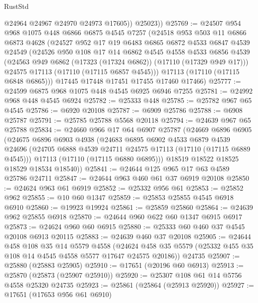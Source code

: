 \begin{lexlean}{RustStd}
\begin{coremodule}
            @24964
            @24967
            @24970
            @24973
            @17605))
        @25023))
@25769 := @24507
    @954
    @968
    @1075
    @448
    @6866
    @6875
    @4545
    @7257
    (@24518
      @953
      @503
      @11
      @6866
      @6873
      @4628
      (@24527
        @952
        @17
        @19
        @6483
        @6865
        @6872
        @4533
        @6847
        @4539
        @24549
        (@24526
          @950
          @108
          @17
          @14
          @6862
          @4545
          @4558
          @4533
          @6856
          @4539
          (@24563 @949 @6862 (@17323 (@17324 @6862)) (@17110 (@17329 @949 @17)))
          @24575
          @17113
          (@17110 (@17115 @6857 @4545)))
        @17113
        (@17110 (@17115 @6848 @6865)))
      @17445
      @17448
      @17451
      @17455
      @17460
      @17466)
@25777 := @24599 @6875 @968 @1075 @448 @4545 @6925 @6946 @7255
@25781 := @24992 @968 @448 @4545 @6924
@25782 := @25333 @448
@25785 := @25782 @967 @65 @4545
@25786 := @6920 @20108
@25787 := @6909 @25786
@25788 := @6908 @25787
@25791 := @25785 @25788 @5568 @20118
@25794 := @24639 @967 @65 @25788
@25834 := @24660
    @966
    @17
    @64
    @6907
    @25787
    (@24669
      @6896
      @6905
      (@24675
        @6896
        @6903
        @4938
        (@24683
          @6895
          @6902
          @4533
          @6879
          @4539
          @24696
          (@24705 @6888 @4539 @24711 @24575 @17113 (@17110 (@17115 @6889 @4545)))
          @17113
          (@17110 (@17115 @6880 @6895)))
        @18519
        @18522
        @18525
        @18529
        @18534
        @18540))
@25841 := @24644 @125 @965 @17 @63 @4589 @25786 @24711
@25847 := @24644 @963 @460 @61 @37 @6919 @20108
@25850 := @24624 @963 @61 @6919
@25852 := @25332 @956 @61
@25853 := @25852 @962
@25855 := @10 @60 @1347
@25859 := @25853 @25855 @4545 @6918 @6910
@25860 := @19923 @19924
@25861 := @25859 @25860
@25864 := @24639 @962 @25855 @6918
@25870 := @24644 @960 @622 @60 @1347 @6915 @6917
@25873 := @24624 @960 @60 @6915
@25880 := @25333 @60 @460 @37 @4545 @20108 @6913 @20115
@25883 := @24639 @460 @37 @20108
@25905 := @24644
    @458
    @108
    @35
    @14
    @5579
    @4558
    (@24624 @458 @35 @5579 (@25332 @455 @35 @108 @14 @4545 @4558 @5577 @17647 @24575 @20186))
    @24735
@25907 := @25880 (@25883 @25905)
@25910 := @17651 (@20196 @60 @6913)
@25913 := @25870 (@25873 (@25907 @25910))
@25920 := @25307 @108 @61 @14 @5756 @4558 @25320 @24735
@25923 := @25861 (@25864 (@25913 @25920))
@25927 := @17651 (@17653 @956 @61 @6910)

\end{coremodule}
\end{lexlean}
